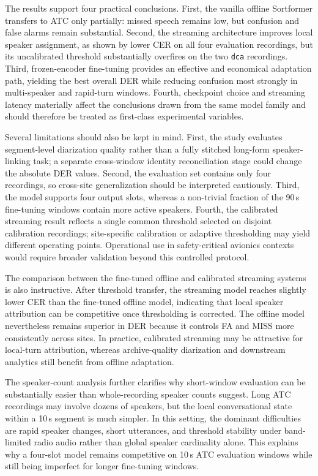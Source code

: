 \documentclass[conference]{IEEEtran}
\begin{document}
The results support four practical conclusions. First, the vanilla offline Sortformer transfers to ATC only partially: missed speech remains low, but confusion and false alarms remain substantial. Second, the streaming architecture improves local speaker assignment, as shown by lower CER on all four evaluation recordings, but its uncalibrated threshold substantially overfires on the two \texttt{dca} recordings. Third, frozen-encoder fine-tuning provides an effective and economical adaptation path, yielding the best overall DER while reducing confusion most strongly in multi-speaker and rapid-turn windows. Fourth, checkpoint choice and streaming latency materially affect the conclusions drawn from the same model family and should therefore be treated as first-class experimental variables.

Several limitations should also be kept in mind. First, the study evaluates segment-level diarization quality rather than a fully stitched long-form speaker-linking task; a separate cross-window identity reconciliation stage could change the absolute DER values. Second, the evaluation set contains only four recordings, so cross-site generalization should be interpreted cautiously. Third, the model supports four output slots, whereas a non-trivial fraction of the 90\,s fine-tuning windows contain more active speakers. Fourth, the calibrated streaming result reflects a single common threshold selected on disjoint calibration recordings; site-specific calibration or adaptive thresholding may yield different operating points. Operational use in safety-critical avionics contexts would require broader validation beyond this controlled protocol.

The comparison between the fine-tuned offline and calibrated streaming systems is also instructive. After threshold transfer, the streaming model reaches slightly lower CER than the fine-tuned offline model, indicating that local speaker attribution can be competitive once thresholding is corrected. The offline model nevertheless remains superior in DER because it controls FA and MISS more consistently across sites. In practice, calibrated streaming may be attractive for local-turn attribution, whereas archive-quality diarization and downstream analytics still benefit from offline adaptation.

The speaker-count analysis further clarifies why short-window evaluation can be substantially easier than whole-recording speaker counts suggest. Long ATC recordings may involve dozens of speakers, but the local conversational state within a 10\,s segment is much simpler. In this setting, the dominant difficulties are rapid speaker changes, short utterances, and threshold stability under band-limited radio audio rather than global speaker cardinality alone. This explains why a four-slot model remains competitive on 10\,s ATC evaluation windows while still being imperfect for longer fine-tuning windows.
\end{document}
